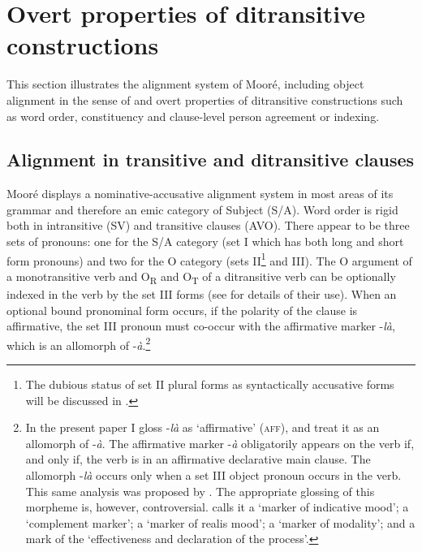 \documentclass[output=paper]{langsci/langscibook}
\begin{document}
\section{Overt properties of ditransitive constructions}\label{§4:overt.pacchiarotti}

This section illustrates the alignment system of Mooré, including object alignment in the sense of \citet{malchukovetal2010} and overt properties of ditransitive constructions such as word order, constituency and clause-level person agreement or indexing.

\subsection{Alignment in transitive and ditransitive clauses}\label{§4.1:alignment.pacchiarotti}

Mooré displays a nominative-accusative alignment system in most areas of its grammar and therefore an emic category of Subject (S/A). Word order is rigid both in intransitive (SV) and transitive clauses (AVO). There appear to be three sets of pronouns: one for the S/A category (set I which has both long and short form pronouns) and two for the O category (sets II\footnote{The dubious status of set II plural forms as syntactically accusative forms will be discussed in .} and III). The O argument of a monotransitive verb and O\textsubscript{R} and O\textsubscript{T} of a ditransitive verb can be optionally indexed in the verb by the set III forms (see  for details of their use). When an optional bound pronominal form occurs, if the polarity of the clause is affirmative, the set III pronoun must co-occur with the affirmative marker -\textit{là}, which is an allomorph of -\textit{à}.\footnote{In the present paper I gloss -\textit{là} as `affirmative' (\textsc{aff}), and treat it as an allomorph of -\textit{à}. The affirmative marker -\textit{à} obligatorily appears on the verb if, and only if, the verb is in an affirmative declarative main clause. The allomorph -\textit{là} occurs only when a set III object pronoun occurs in the verb. This same analysis was proposed by \citet{manessy1963}. The appropriate glossing of this morpheme is, however, controversial. \citet[96]{alexandre1953} calls it a `marker of indicative mood'; \citet[112]{peterson1971} a `complement marker'; \citet{canu1974} a `marker of realis mood'; \citet{kabore1985} a `marker of modality'; and \citet{nikiema2003} a mark of the `effectiveness and declaration of the process'.} 
\end{document}

